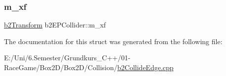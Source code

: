 \mbox{\label{structb2_e_p_collider_a096b61a983a24fa26ee3089b4ec59ab8}} 
\subsubsection{\texorpdfstring{m\_xf}{m\_xf}}
{\footnotesize\ttfamily \mbox{\hyperlink{structb2_transform}{b2\+Transform}} b2\+E\+P\+Collider\+::m\+\_\+xf}



The documentation for this struct was generated from the following file\+:\begin{DoxyCompactItemize}
\item 
E\+:/\+Uni/6.\+Semester/\+Grundkurs\+\_\+\+C++/01-\/\+Race\+Game/\+Box2\+D/\+Box2\+D/\+Collision/\mbox{\hyperlink{b2_collide_edge_8cpp}{b2\+Collide\+Edge.\+cpp}}\end{DoxyCompactItemize}
